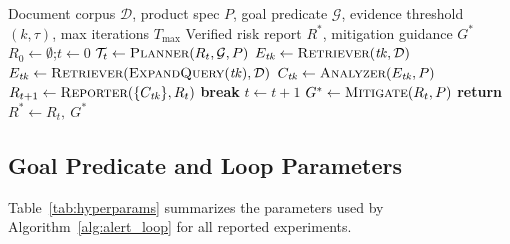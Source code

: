 \begin{algorithm}[h]
\caption{ALERT Goal-Conditioned Agentic Loop}
\label{alg:alert_loop}
\begin{algorithmic}[1]
\REQUIRE Document corpus $\mathcal{D}$, product spec $P$, goal predicate $\mathcal{G}$, evidence threshold $(k,\tau)$, max iterations $T_{\max}$
\ENSURE Verified risk report $R^*$, mitigation guidance $G^*$
\STATE $R_0 \gets \emptyset$;\quad $t \gets 0$
  \STATE $\mathcal{T}_t \gets \textsc{Planner}(R_t, \mathcal{G}, P)$ 
    \STATE $E_{\mathit{tk}} \gets \textsc{Retriever}(\mathit{tk},\mathcal{D})$ 
      \STATE $E_{\mathit{tk}} \gets \textsc{Retriever}(\textsc{ExpandQuery}(\mathit{tk}),\mathcal{D})$
    \ENDIF
    \STATE $C_{\mathit{tk}} \gets \textsc{Analyzer}(E_{\mathit{tk}}, P)$ 
  \ENDFOR
  \STATE $R_{t+1} \gets \textsc{Reporter}(\{C_{\mathit{tk}}\}, R_t)$
    \STATE \textbf{break}
  \ENDIF
  \STATE $t \gets t+1$
\ENDWHILE
\STATE $G^* \gets \textsc{Mitigate}(R_t, P)$ 
\STATE \textbf{return} $R^* \gets R_t,\ G^*$
\end{algorithmic}
\end{algorithm}

\subsection{Goal Predicate and Loop Parameters}

Table~\ref{tab:hyperparams} summarizes the parameters used by Algorithm~\ref{alg:alert_loop} for all reported experiments.


